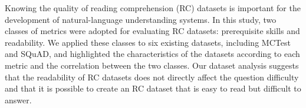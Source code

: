 Knowing the quality of reading comprehension (RC) datasets is important for the development of natural-language understanding systems. In this study, two classes of metrics were adopted for evaluating RC datasets: prerequisite skills and readability. We applied these classes to six existing datasets, including MCTest and SQuAD, and highlighted the characteristics of the datasets according to each metric and the correlation between the two classes. Our dataset analysis suggests that the readability of RC datasets does not directly affect the question difficulty and that it is possible to create an RC dataset that is easy to read but difficult to answer.
